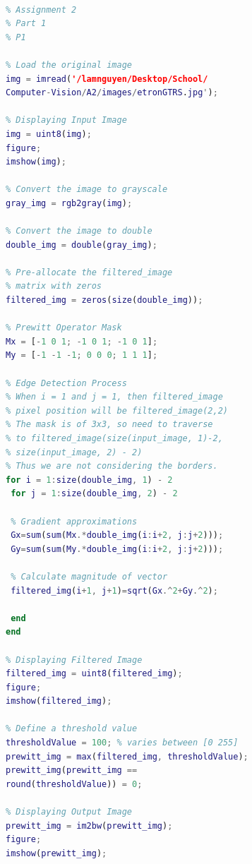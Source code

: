 \documentclass[conference]{IEEEtran}
\begin{document}
\begin{lstlisting}[language=Matlab]

% Assignment 2
% Part 1
% P1

% Load the original image
img = imread('/lamnguyen/Desktop/School/
Computer-Vision/A2/images/etronGTRS.jpg');

% Displaying Input Image
img = uint8(img);
figure; 
imshow(img); 

% Convert the image to grayscale
gray_img = rgb2gray(img);

% Convert the image to double
double_img = double(gray_img);
  
% Pre-allocate the filtered_image 
% matrix with zeros
filtered_img = zeros(size(double_img));

% Prewitt Operator Mask
Mx = [-1 0 1; -1 0 1; -1 0 1];
My = [-1 -1 -1; 0 0 0; 1 1 1];

% Edge Detection Process
% When i = 1 and j = 1, then filtered_image 
% pixel position will be filtered_image(2,2)
% The mask is of 3x3, so need to traverse
% to filtered_image(size(input_image, 1)-2,
% size(input_image, 2) - 2)
% Thus we are not considering the borders.
for i = 1:size(double_img, 1) - 2
 for j = 1:size(double_img, 2) - 2

 % Gradient approximations
 Gx=sum(sum(Mx.*double_img(i:i+2, j:j+2)));
 Gy=sum(sum(My.*double_img(i:i+2, j:j+2)));
				
 % Calculate magnitude of vector
 filtered_img(i+1, j+1)=sqrt(Gx.^2+Gy.^2);
		
 end
end

% Displaying Filtered Image
filtered_img = uint8(filtered_img);
figure;
imshow(filtered_img);
  
% Define a threshold value
thresholdValue = 100; % varies between [0 255]
prewitt_img = max(filtered_img, thresholdValue);
prewitt_img(prewitt_img == 
round(thresholdValue)) = 0;
  
% Displaying Output Image
prewitt_img = im2bw(prewitt_img);
figure;
imshow(prewitt_img); 

\end{lstlisting}
\end{document}

